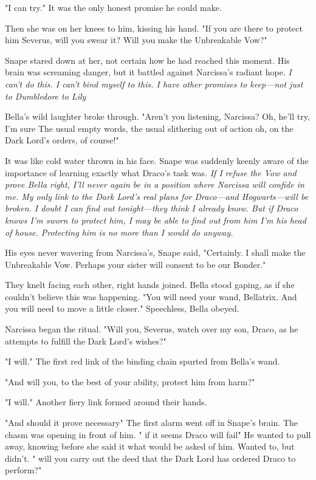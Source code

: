 "I can try." It was the only honest promise he could make.

Then she was on her knees to him, kissing his hand. "If you are there to protect him{\el} Severus, will you swear it? Will you make the Unbreakable Vow?"

Snape stared down at her, not certain how he had reached this moment. His brain was screaming danger, but it battled against Narcissa's radiant hope. \emph{I can't do this. I can't bind myself to this. I have other promises to keep—not just to Dumbledore{\el} to Lily{\el}}

Bella's wild laughter broke through. "Aren't you listening, Narcissa? Oh, he'll try, I'm sure{\el} The usual empty words, the usual slithering out of action{\el} oh, on the Dark Lord's orders, of course!"

It was like cold water thrown in his face. Snape was suddenly keenly aware of the importance of learning exactly what Draco's task was. \emph{If I refuse the Vow and prove Bella right, I'll never again be in a position where Narcissa will confide in me. My only link to the Dark Lord's real plans for Draco—and Hogwarts—will be broken. I doubt I can find out tonight—they think I already know. But if Draco knows I'm sworn to protect him, I may be able to find out from him{\el} I'm his head of house. Protecting him is no more than I would do anyway.}

His eyes never wavering from Narcissa's, Snape said, "Certainly. I shall make the Unbreakable Vow. Perhaps your sister will consent to be our Bonder."

They knelt facing each other, right hands joined. Bella stood gaping, as if she couldn't believe this was happening. "You will need your wand, Bellatrix. And you will need to move a little closer." Speechless, Bella obeyed.

Narcissa began the ritual. "Will you, Severus, watch over my son, Draco, as he attempts to fulfill the Dark Lord's wishes?"

"I will." The first red link of the binding chain spurted from Bella's wand.

"And will you, to the best of your ability, protect him from harm?"

"I will." Another fiery link formed around their hands.

"And should it prove necessary{\el}" The first alarm went off in Snape's brain. The chasm was opening in front of him. "{\el} if it seems Draco will fail{\el}" He wanted to pull away, knowing before she said it what would be asked of him. Wanted to, but didn't. "{\el} will you carry out the deed that the Dark Lord has ordered Draco to perform?"

